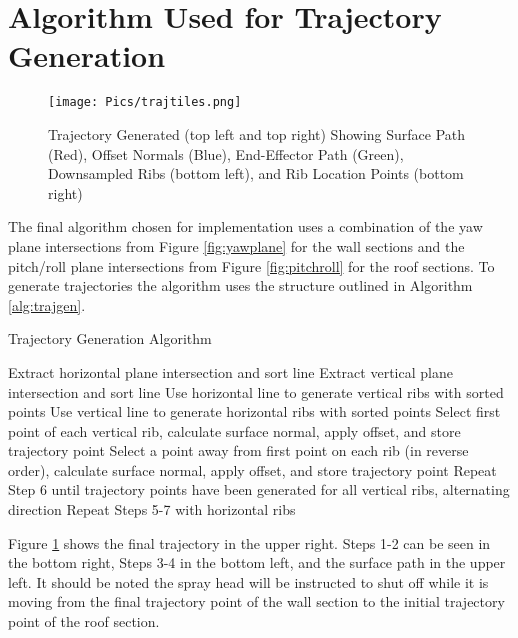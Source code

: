\section{Algorithm Used for Trajectory Generation}

\begin{figure}[H]
    \centering
    \texttt{[image: Pics/trajtiles.png]}
    \caption{Trajectory Generated (top left and top right) Showing Surface Path (Red), Offset Normals (Blue), End-Effector Path (Green), Downsampled Ribs (bottom left), and Rib Location Points (bottom right)}
    \label{fig:trajtiles}
\end{figure}

The final algorithm chosen for implementation uses a combination of the yaw plane intersections from Figure \ref{fig:yawplane} for the wall sections and the pitch/roll plane intersections from Figure \ref{fig:pitchroll} for the roof sections. To generate trajectories the algorithm uses the structure outlined in Algorithm \ref{alg:trajgen}.\\

\begin{algorithm}[H]
\caption{Trajectory Generation Algorithm}
\label{alg:trajgen}
\begin{algorithmic}[1]

    \State Extract horizontal plane intersection and sort line
    \State Extract vertical plane intersection and sort line
    \State Use horizontal line to generate vertical ribs with sorted points
    \State Use vertical line to generate horizontal ribs with sorted points
    \State Select first point of each vertical rib, calculate surface normal, apply offset, and store trajectory point
    \State Select a point  away from first point on each rib (in reverse order), calculate surface normal, apply offset, and store trajectory point
    \State Repeat Step 6 until trajectory points have been generated for all vertical ribs, alternating direction
    \State Repeat Steps 5-7 with horizontal ribs

\end{algorithmic}
\end{algorithm}

Figure \ref{fig:trajtiles} shows the final trajectory in the upper right. Steps 1-2 can be seen in the bottom right, Steps 3-4 in the bottom left, and the surface path in the upper left. It should be noted the spray head will be instructed to shut off while it is moving from the final trajectory point of the wall section to the initial trajectory point of the roof section.\\

